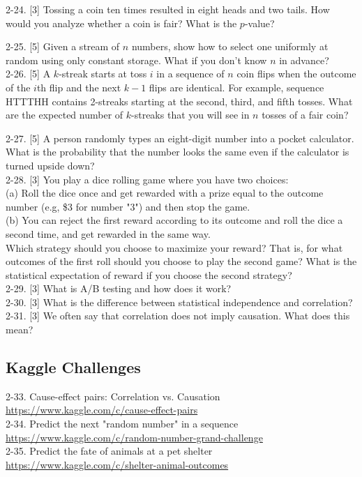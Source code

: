 \documentclass[10pt]{article}
\begin{document}
2-24. [3] Tossing a coin ten times resulted in eight heads and two tails. How would you analyze whether a coin is fair? What is the $p$-value?

2-25. [5] Given a stream of $n$ numbers, show how to select one uniformly at random using only constant storage. What if you don't know $n$ in advance?\\[0pt]

2-26. [5] A $k$-streak starts at toss $i$ in a sequence of $n$ coin flips when the outcome of the $i$th flip and the next $k-1$ flips are identical. For example, sequence HTTTHH contains 2-streaks starting at the second, third, and fifth tosses. What are the expected number of $k$-streaks that you will see in $n$ tosses of a fair coin?

2-27. [5] A person randomly types an eight-digit number into a pocket calculator. What is the probability that the number looks the same even if the calculator is turned upside down?\\[0pt]

2-28. [3] You play a dice rolling game where you have two choices:\\
(a) Roll the dice once and get rewarded with a prize equal to the outcome number (e.g, \$3 for number "3") and then stop the game.\\
(b) You can reject the first reward according to its outcome and roll the dice a second time, and get rewarded in the same way.\\

Which strategy should you choose to maximize your reward? That is, for what outcomes of the first roll should you choose to play the second game? What is the statistical expectation of reward if you choose the second strategy?\\[0pt]

2-29. [3] What is A/B testing and how does it work?\\[0pt]
2-30. [3] What is the difference between statistical independence and correlation?\\[0pt]
2-31. [3] We often say that correlation does not imply causation. What does this mean?

\subsection{Kaggle Challenges}
2-33. Cause-effect pairs: Correlation vs. Causation\\
\href{https://www.kaggle.com/c/cause-effect-pairs}{https://www.kaggle.com/c/cause-effect-pairs}\\
2-34. Predict the next "random number" in a sequence\\
\href{https://www.kaggle.com/c/random-number-grand-challenge}{https://www.kaggle.com/c/random-number-grand-challenge}\\
2-35. Predict the fate of animals at a pet shelter\\
\href{https://www.kaggle.com/c/shelter-animal-outcomes}{https://www.kaggle.com/c/shelter-animal-outcomes}
\end{document}
